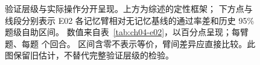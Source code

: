 \begin{figure}[htbp]
\centering

\caption{验证层级与实际操作分开呈现。上方为综述的定性框架\cite{rsi-survey-2607}；
下方点与线段分别表示 E02 各记忆臂相对无记忆基线的通过率差和历史 95\% 题级自助区间。
数值来自表~\ref{tab:ch04-e02}，以百分点呈现；每臂  题、每题  个回合。
区间含零不表示等价，臂间差异应直接比较。此图保留旧估计，不替代完整验证层级的检验。}
\label{fig:ch04-ladder}
\end{figure}
